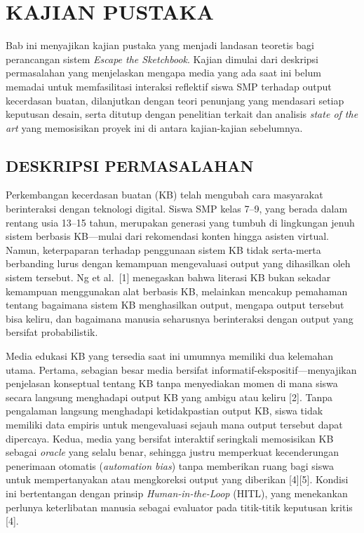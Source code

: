 
\chapter{KAJIAN PUSTAKA}
\label{chap:bab2}

Bab ini menyajikan kajian pustaka yang menjadi landasan teoretis bagi perancangan sistem \textit{Escape the Sketchbook}. Kajian dimulai dari deskripsi permasalahan yang menjelaskan mengapa media yang ada saat ini belum memadai untuk memfasilitasi interaksi reflektif siswa SMP terhadap output kecerdasan buatan, dilanjutkan dengan teori penunjang yang mendasari setiap keputusan desain, serta ditutup dengan penelitian terkait dan analisis \textit{state of the art} yang memosisikan proyek ini di antara kajian-kajian sebelumnya.

\section{DESKRIPSI PERMASALAHAN}
\label{sec:deskripsi-permasalahan}

Perkembangan kecerdasan buatan (KB) telah mengubah cara masyarakat berinteraksi dengan teknologi digital. Siswa SMP kelas 7--9, yang berada dalam rentang usia 13--15 tahun, merupakan generasi yang tumbuh di lingkungan jenuh sistem berbasis KB---mulai dari rekomendasi konten hingga asisten virtual. Namun, keterpaparan terhadap penggunaan sistem KB tidak serta-merta berbanding lurus dengan kemampuan mengevaluasi output yang dihasilkan oleh sistem tersebut. Ng et al.\ [1] menegaskan bahwa literasi KB bukan sekadar kemampuan menggunakan alat berbasis KB, melainkan mencakup pemahaman tentang bagaimana sistem KB menghasilkan output, mengapa output tersebut bisa keliru, dan bagaimana manusia seharusnya berinteraksi dengan output yang bersifat probabilistik.

Media edukasi KB yang tersedia saat ini umumnya memiliki dua kelemahan utama. Pertama, sebagian besar media bersifat informatif-ekspositif---menyajikan penjelasan konseptual tentang KB tanpa menyediakan momen di mana siswa secara langsung menghadapi output KB yang ambigu atau keliru [2]. Tanpa pengalaman langsung menghadapi ketidakpastian output KB, siswa tidak memiliki data empiris untuk mengevaluasi sejauh mana output tersebut dapat dipercaya. Kedua, media yang bersifat interaktif seringkali memosisikan KB sebagai \textit{oracle} yang selalu benar, sehingga justru memperkuat kecenderungan penerimaan otomatis (\textit{automation bias}) tanpa memberikan ruang bagi siswa untuk mempertanyakan atau mengkoreksi output yang diberikan [4][5]. Kondisi ini bertentangan dengan prinsip \textit{Human-in-the-Loop} (HITL), yang menekankan perlunya keterlibatan manusia sebagai evaluator pada titik-titik keputusan kritis [4].

